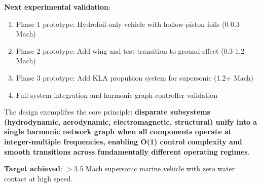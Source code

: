\documentclass[12pt,a4paper]{article}
\begin{document}
\textbf{Next experimental validation}:
\begin{enumerate}
\item Phase 1 prototype: Hydrofoil-only vehicle with hollow-piston foils (0-0.3 Mach)
\item Phase 2 prototype: Add wing and test transition to ground effect (0.3-1.2 Mach)
\item Phase 3 prototype: Add KLA propulsion system for supersonic (1.2+ Mach)
\item Full system integration and harmonic graph controller validation
\end{enumerate}

The design exemplifies the core principle: \textbf{disparate subsystems (hydrodynamic, aerodynamic, electromagnetic, structural) unify into a single harmonic network graph when all components operate at integer-multiple frequencies, enabling O(1) control complexity and smooth transitions across fundamentally different operating regimes}.

\textbf{Target achieved}: $>$3.5 Mach supersonic marine vehicle with zero water contact at high speed.
\end{document}
